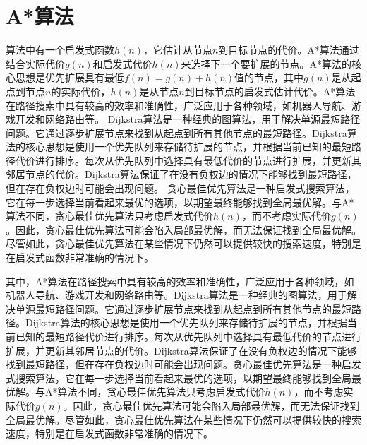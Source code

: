 \documentclass{article}
\begin{document}
\section{A*算法}
算法中有一个启发式函数$h(n)$，它估计从节点$n$到目标节点的代价。A*算法通过结合实际代价$g(n)$和启发式代价$h(n)$来选择下一个要扩展的节点。A*算法的核心思想是优先扩展具有最低$f(n) = g(n) + h(n)$值的节点，其中$g(n)$是从起点到节点$n$的实际代价，$h(n)$是从节点$n$到目标节点的启发式估计代价。A*算法在路径搜索中具有较高的效率和准确性，广泛应用于各种领域，如机器人导航、游戏开发和网络路由等。
Dijkstra算法是一种经典的图算法，用于解决单源最短路径问题。它通过逐步扩展节点来找到从起点到所有其他节点的最短路径。Dijkstra算法的核心思想是使用一个优先队列来存储待扩展的节点，并根据当前已知的最短路径代价进行排序。每次从优先队列中选择具有最低代价的节点进行扩展，并更新其邻居节点的代价。Dijkstra算法保证了在没有负权边的情况下能够找到最短路径，但在存在负权边时可能会出现问题。
贪心最佳优先算法是一种启发式搜索算法，它在每一步选择当前看起来最优的选项，以期望最终能够找到全局最优解。与A*算法不同，贪心最佳优先算法只考虑启发式代价$h(n)$，而不考虑实际代价$g(n)$。因此，贪心最佳优先算法可能会陷入局部最优解，而无法保证找到全局最优解。尽管如此，贪心最佳优先算法在某些情况下仍然可以提供较快的搜索速度，特别是在启发式函数非常准确的情况下。

其中，A*算法在路径搜索中具有较高的效率和准确性，广泛应用于各种领域，如机器人导航、游戏开发和网络路由等。Dijkstra算法是一种经典的图算法，用于解决单源最短路径问题。它通过逐步扩展节点来找到从起点到所有其他节点的最短路径。Dijkstra算法的核心思想是使用一个优先队列来存储待扩展的节点，并根据当前已知的最短路径代价进行排序。每次从优先队列中选择具有最低代价的节点进行扩展，并更新其邻居节点的代价。Dijkstra算法保证了在没有负权边的情况下能够找到最短路径，但在存在负权边时可能会出现问题。贪心最佳优先算法是一种启发式搜索算法，它在每一步选择当前看起来最优的选项，以期望最终能够找到全局最优解。与A*算法不同，贪心最佳优先算法只考虑启发式代价$h(n)$，而不考虑实际代价$g(n)$。因此，贪心最佳优先算法可能会陷入局部最优解，而无法保证找到全局最优解。尽管如此，贪心最佳优先算法在某些情况下仍然可以提供较快的搜索速度，特别是在启发式函数非常准确的情况下。
\end{document}
